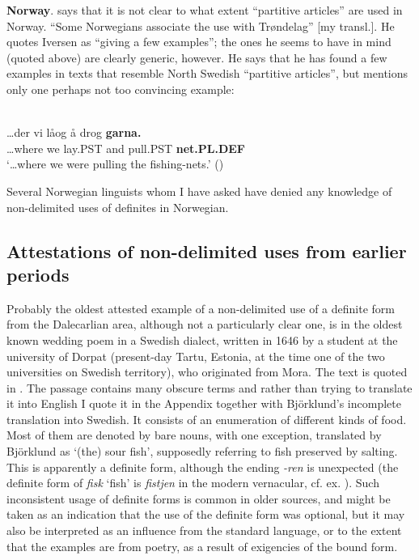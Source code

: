 \textbf{Norway}. \citet[16]{Delsing2003a} says that it is not clear to what extent “partitive articles” are used in Norway. “Some Norwegians associate the use with Trøndelag” [my transl.]. He quotes Iversen as “giving a few examples”; the ones he seems to have in mind (quoted above) are clearly generic, however. He says that he has found a few examples in texts that resemble North Swedish “partitive articles”, but mentions only one perhaps not too convincing example: 

\ea \label{} 
\\
\gll …der  vi  låog  å  drog  \textbf{garna.}\textit{  }\\
…where  we  lay.PST   and  pull.PST  \textbf{net.PL.DEF} \\
\glt ‘…where we were pulling the fishing-nets.’ (\citet[16]{Delsing2003a})

\z

Several Norwegian linguists whom I have asked have denied any knowledge of non-delimited uses of definites in Norwegian. 

\subsection{ Attestations of non-delimited uses from earlier periods}
\label{bkm:Ref154983425}

Probably the oldest attested example of a non-delimited use of a definite form from the Dalecarlian area, although not a particularly clear one, is in the oldest known wedding poem in a Swedish dialect, written in 1646 by a student at the university of Dorpat (present-day Tartu, Estonia, at the time one of the two universities on Swedish territory), who originated from Mora. The text is quoted in \citet[166]{Björklund1994}. The passage contains many obscure terms and rather than trying to translate it into English I quote it in the Appendix together with Björklund’s incomplete translation into Swedish. It consists of an enumeration of different kinds of food. Most of them are denoted by bare nouns, with one exception, translated by Björklund as  ‘(the) sour fish’, supposedly referring to fish preserved by salting. This is apparently a definite form, although the ending \textit{{}-ren} is unexpected (the definite form of \textit{fisk} ‘fish’ is \textit{fistjen} in the modern vernacular, cf. ex. ). Such inconsistent usage of definite forms is common in older sources, and might be taken as an indication that the use of the definite form was optional, but it may also be interpreted as an influence from the standard language, or to the extent that the examples are from poetry, as a result of exigencies of the bound form. 

